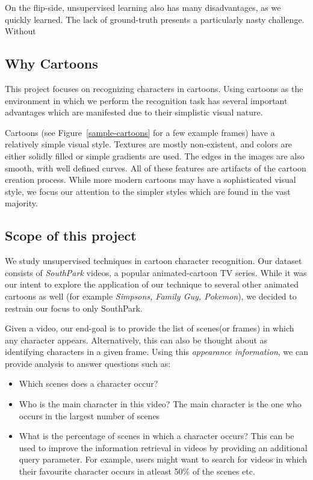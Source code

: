 \documentclass[10pt,twocolumn,letterpaper]{article}
\begin{document}
On the flip-side, unsupervised learning also has many disadvantages,
as we quickly learned. The lack of ground-truth presents a
particularly nasty challenge. Without 

\subsection{Why Cartoons}
This project focuses on recognizing characters in cartoons. Using
cartoons as the environment in which we perform the recognition task
has several important advantages which are manifested due to their
simplistic visual nature.

Cartoons (see Figure~\ref{sample-cartoons} for a few example frames)
have a relatively simple visual style. Textures are mostly
non-existent, and colors are either solidly filled or simple gradients
are used. The edges in the images are also smooth, with well defined
curves. All of these features are artifacts of the cartoon creation
process. While more modern cartoons may have a sophisticated visual
style, we focus our attention to the simpler styles which are found in
the vast majority.


\subsection{Scope of this project}
We study unsupervised techniques in cartoon character recognition. Our
dataset consists of \emph{SouthPark} videos, a popular
animated-cartoon TV series. While it was our intent to explore the
application of our technique to several other animated cartoons as
well (for example \emph{Simpsons, Family Guy, Pokemon}), we decided to
restrain our focus to only SouthPark. 

Given a video, our end-goal is to provide the list of scenes(or
frames) in which any character appears. Alternatively, this can also
be thought about as identifying characters in a given frame. Using
this \emph{appearance information}, we can provide analysis to answer
questions such as:

\begin{itemize}
\item Which scenes does a character occur?
\item Who is the main character in this video? The main character is
  the one who occurs in the largest number of scenes
\item What is the percentage of scenes in which a character occurs?
  This can be used to improve the information retrieval in videos by
  providing an additional query parameter. For example, users might
  want to search for videos in which their favourite character occurs
  in atleast 50\% of the scenes etc.
\end{itemize}
\end{document}
